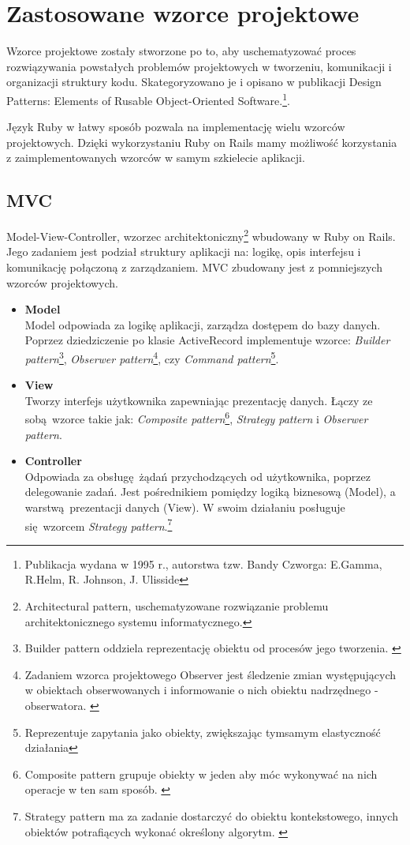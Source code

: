 \section{Zastosowane wzorce projektowe}
Wzorce projektowe zostały stworzone po to, aby uschematyzować proces rozwiązywania powstałych problemów projektowych w tworzeniu, komunikacji i organizacji struktury kodu. Skategoryzowano je i opisano w publikacji Design Patterns: Elements of Rusable Object-Oriented Software.\footnote{Publikacja wydana w 1995 r., autorstwa tzw. Bandy Czworga: E.Gamma, R.Helm, R. Johnson, J. Ulisside}.

Język Ruby w łatwy sposób pozwala na implementację wielu wzorców projektowych. Dzięki wykorzystaniu Ruby on Rails mamy możliwość korzystania z zaimplementowanych wzorców w samym szkielecie aplikacji.
  \subsection{MVC}
   Model-View-Controller, wzorzec architektoniczny\footnote{Architectural pattern, uschematyzowane rozwiązanie problemu architektonicznego systemu informatycznego.} wbudowany w Ruby on Rails. Jego zadaniem jest podział struktury aplikacji na: logikę, opis interfejsu i komunikację połączoną z zarządzaniem.
   MVC zbudowany jest z pomniejszych wzorców projektowych.
    \begin{itemize}
      \item \textbf {Model} \\
      Model odpowiada za logikę aplikacji, zarządza dostępem do bazy danych.
      Poprzez dziedziczenie po klasie ActiveRecord implementuje wzorce: \emph{Builder pattern}\footnote{Builder pattern oddziela reprezentację obiektu od procesów jego tworzenia. \cite{ruby_patterns}}, \emph{Obserwer pattern}\footnote{Zadaniem wzorca projektowego Observer jest śledzenie zmian występujących w obiektach obserwowanych i informowanie o nich obiektu nadrzędnego - obserwatora. \cite{ruby_patterns}}, czy \emph{Command pattern}\footnote{Reprezentuje zapytania jako obiekty, zwiększając tymsamym elastyczność działania\cite{ruby_patterns}}.
      \item \textbf {View} \\
      Tworzy interfejs użytkownika zapewniając prezentację danych. Łączy ze sobą wzorce takie jak: \emph{Composite pattern}\footnote{Composite pattern grupuje obiekty w jeden aby móc wykonywać na nich operacje w ten sam sposób. \cite{ruby_patterns}}, \emph{Strategy pattern} i \emph{Obserwer pattern}.
      \item \textbf {Controller} \\
      Odpowiada za obsługę żądań przychodzących od użytkownika, poprzez delegowanie zadań. Jest pośrednikiem pomiędzy logiką biznesową (Model), a warstwą prezentacji danych (View). W swoim działaniu posługuje się wzorcem \emph{Strategy pattern}.\footnote{ Strategy pattern ma za zadanie dostarczyć do obiektu kontekstowego, innych obiektów potrafiących wykonać określony algorytm. \cite{ruby_patterns}}
    \end{itemize}

